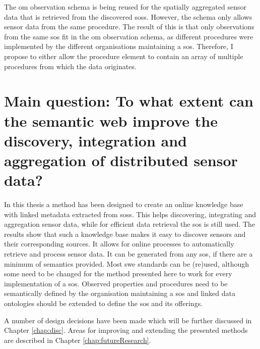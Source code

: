 The \ac{om} observation schema is being reused for the spatially aggregated sensor data that is retrieved from the discovered \aclp{sos}. However, the schema only allows sensor data from the same procedure. The result of this is that only observations from the same \ac{sos} fit in the \ac{om} observation schema, as different procedures were implemented by the different organisations maintaining a \ac{sos}. Therefore, I propose to either allow the procedure element to contain an array of multiple procedures from which the data originates. 


\section*{\textbf{Main question:} To what extent can the semantic web improve the discovery, integration and aggregation of distributed sensor data?}%

In this thesis a method has been designed to create an online knowledge base with linked metadata extracted from \aclp{sos}. This helps discovering, integrating and aggregation sensor data, while for efficient data retrieval the \ac{sos} is still used. The results show that such a knowledge base makes it easy to discover sensors and their corresponding sources. It allows for online processes to automatically retrieve and process sensor data. It can be generated from any \ac{sos}, if there are a minimum of semantics provided. Most \ac{swe} standards can be (re)used, although some need to be changed for the method presented here to work for every implementation of a \ac{sos}. Observed properties and procedures need to be semantically defined by the organisation maintaining a \ac{sos} and linked data ontologies should be extended to define the \acl{sos} and its offerings. 

A number of design decisions have been made which will be further discussed in Chapter \ref{chap:disc}. Areas for improving and extending the presented methods are described in Chapter \ref{chap:futureResearch}.

